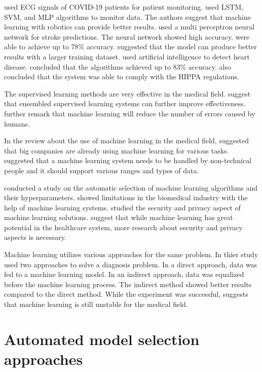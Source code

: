 \cite{ref_paper_40} used ECG signals of COVID-19 patients for patient monitoring. \cite{ref_paper_40} used LSTM, SVM, and MLP algorithms to monitor data. The authors suggest that machine learning with robotics can provide better results.
\cite{ref_paper_42} used a multi perceptron neural network for stroke predictions. The neural network showed high accuracy. \cite{ref_paper_42} were able to achieve up to 78\% accuracy. \cite{ref_paper_42} suggested that the model can produce better results with a larger training dataset. \cite{ref_paper_41} used artificial intelligence to detect heart disease. \cite{ref_paper_41} concluded that the algorithms achieved up to 83\% accuracy. \cite{ref_paper_41} also concluded that the system was able to comply with the HIPPA regulations.

The supervised learning methods are very effective in the medical field. \cite{ref_paper_11} suggest that ensembled supervised learning systems can further improve effectiveness. \cite{ref_paper_11} further remark that machine learning will reduce the number of errors caused by humans.

In the review about the use of machine learning in the medical field, \cite{ref_paper_33} suggested that big companies are already using machine learning for various tasks. \cite{ref_paper_33} suggested that a machine learning system needs to be handled by non-technical people and it should support various ranges and types of data.

\cite{ref_paper_32} conducted a study on the automatic selection of machine learning algorithms and their hyperparameters. \cite{ref_paper_32} showed limitations in the biomedical industry with the help of machine learning systems. \cite{ref_paper_37} studied the security and privacy aspect of machine learning solutions. \cite{ref_paper_37} suggest that while machine learning has great potential in the healthcare system, more research about security and privacy aspects is necessary.

Machine learning utilizes various approaches for the same problem. In thier study \cite{ref_paper_8} used two approaches to solve a diagnosis problem. In a direct approach, data was fed to a machine learning model. In an indirect approach, data was equalized before the machine learning process. The indirect method showed better results compared to the direct method. While the experiment was successful, \cite{ref_paper_8} suggests that machine learning is still unstable for the medical field.

\section{Automated model selection approaches} \label{sec:automated_model_selection_approaches}

